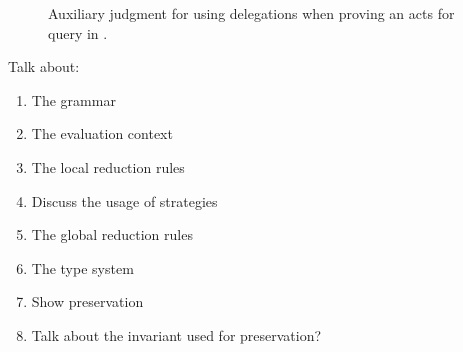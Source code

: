 \begin{figure}
    \centering
    \caption{Auxiliary judgment for using delegations when proving an acts for query in \lang.}
    \label{fig:act-for-judgment-del}
\end{figure}

Talk about:
\begin{enumerate}
    \item The grammar
    \item The evaluation context
    \item The local reduction rules
    \item Discuss the usage of strategies
    \item The global reduction rules
    \item The type system
    \item Show preservation
    \item Talk about the invariant used for preservation?
\end{enumerate}